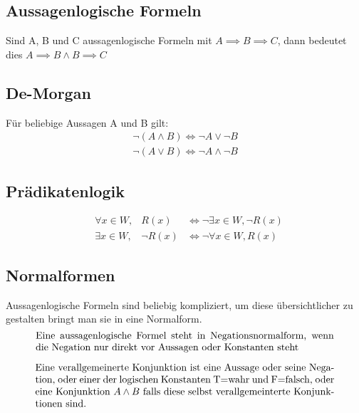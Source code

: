 \documentclass[../Main.tex]{subfiles}
\begin{document}
\subsection{Aussagenlogische Formeln}
Sind A, B und C aussagenlogische Formeln mit \(A \implies B \implies C \), dann bedeutet dies \( A \implies B \land B \implies C \)
\subsection{De-Morgan}
Für beliebige Aussagen A und B gilt:
\begin{equation}
    \begin{split}
        \lnot(A \land B) \Leftrightarrow \lnot A \lor \lnot B \\
        \lnot(A \lor B) \Leftrightarrow \lnot A \land \lnot B 
    \end{split}
\end{equation}
\subsection{Prädikatenlogik}
\begin{equation}
    \begin{aligned}
        &\forall x \in W, &R(x) &\Leftrightarrow \lnot \exists x \in W, \lnot R(x)\\
        &\exists x \in W, &\lnot R(x) &\Leftrightarrow \lnot \forall x \in W, R(x)
    \end{aligned}
\end{equation}

\subsection{Normalformen}
Aussagenlogische Formeln sind beliebig kompliziert, um diese übersichtlicher zu gestalten bringt man sie in eine Normalform.
\begin{equation}
    \parbox{30em}{Eine aussagenlogische Formel steht in Negationsnormalform,
    wenn die Negation nur direkt vor Aussagen oder Konstanten steht}
\end{equation}

\begin{equation}
    \parbox{30em}{Eine verallgemeinerte Konjunktion ist eine Aussage oder seine Negation, 
    oder einer der logischen Konstanten T=wahr und F=falsch, 
    oder eine Konjunktion \(A \land B \) falls diese selbst 
    verallgemeinterte Konjunktionen sind.}
\end{equation}
\end{document}
